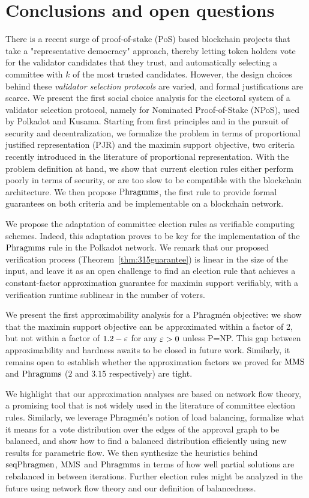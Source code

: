 \section{Conclusions and open questions}\label{s:conc}

There is a recent surge of proof-of-stake (PoS) based blockchain projects that take a "representative democracy" approach, thereby letting token holders vote for the validator candidates that they trust, and automatically selecting a committee with $k$ of the most trusted candidates. However, the design choices behind these \emph{validator selection protocols} are varied, and formal justifications are scarce. 
%
We present the first social choice analysis for the electoral system of a validator selection protocol, namely for Nominated Proof-of-Stake (NPoS), used by Polkadot and Kusama. 
%
Starting from first principles and in the pursuit of security and decentralization, we formalize the problem in terms of proportional justified representation (PJR) and the maximin support objective, two criteria recently introduced in the literature of proportional representation.
With the problem definition at hand, we show that current election rules either perform poorly in terms of security, or are too slow to be compatible with the blockchain architecture. We then propose $\operatorname{Phragmms}$, the first rule to provide formal guarantees on both criteria and be implementable on a blockchain network. 

We propose the adaptation of committee election rules as verifiable computing schemes. Indeed, this adaptation proves to be key for the implementation of the $\operatorname{Phragmms}$ rule in the Polkadot network. 
We remark that our proposed verification process (Theorem~\ref{thm:315guarantee}) is linear in the size of the input, and leave it as an open challenge to find an election rule that achieves a constant-factor approximation guarantee for maximin support verifiably, with a verification runtime sublinear in the number of voters.

We present the first approximability analysis for a Phragm\'{e}n objective: we show that the maximin support objective can be approximated within a factor of 2, but not within a factor of $1.2-\varepsilon$ for any $\varepsilon>0$ unless P=NP. This gap between approximability and hardness awaits to be closed in future work. 
Similarly, it remains open to establish whether the approximation factors we proved for $\operatorname{MMS}$ and $\operatorname{Phragmms}$ ($2$ and $3.15$ respectively) are tight.

We highlight that our approximation analyses are based on network flow theory, a promising tool that is not widely used in the literature of committee election rules. 
Similarly, we leverage Phragm\'{e}n's notion of load balancing, formalize what it means for a vote distribution over the edges of the approval graph to be balanced, and show how to find a balanced distribution efficiently using new results for parametric flow. We then synthesize the heuristics behind $\operatorname{seqPhragmen}$, $\operatorname{MMS}$ and $\operatorname{Phragmms}$ in terms of how well partial solutions are rebalanced in between iterations. 
Further election rules might be analyzed in the future using network flow theory and our definition of balancedness. 

